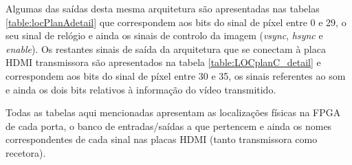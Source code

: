 Algumas das saídas desta mesma arquitetura são apresentadas nas tabelas \ref{table:locPlanAdetail} que correspondem aos bits do sinal de píxel entre 0 e 29, o seu sinal de relógio e ainda os sinais de controlo da imagem (\textit{vsync}, \textit{hsync} e \textit{enable}). Os restantes sinais de saída da arquitetura que se conectam à placa HDMI transmissora são apresentados na tabela \ref{table:LOCplanC_detail} e correspondem aos bits do sinal de píxel entre 30 e 35, os sinais referentes ao som e ainda os dois bits relativos à informação do vídeo transmitido.

Todas as tabelas aqui mencionadas apresentam as localizações físicas na FPGA de cada porta, o banco de entradas/saídas a que pertencem e ainda os nomes correspondentes de cada sinal nas placas HDMI (tanto transmissora como recetora).


